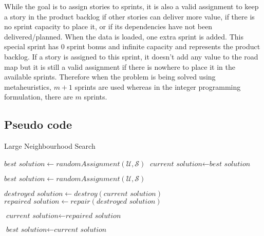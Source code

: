 While the goal is to assign stories to sprints, it is also a valid assignment to keep a story in the product backlog if other stories can deliver more value, if there is no sprint capacity to place it, or if its dependencies have not been delivered/planned. When the data is loaded, one extra sprint is added. This special sprint has 0 sprint bonus and infinite capacity and represents the product backlog. If a story is assigned to this sprint, it doesn't add any value to the road map but it is still a valid assignment if there is nowhere to place it in the available sprints. Therefore when the problem is being solved using metaheuristics, $m + 1$ sprints are used whereas in the integer programming formulation, there are $m$ sprints.

\subsection{Pseudo code}

\begin{algorithm}[H]
\caption{Large Neighbourhood Search}\label{metaheuristic}
\begin{algorithmic}[1]
        \State $\textit{best solution} \gets \textit{randomAssignment}(\mathcal{U}, \mathcal{S})$
        \State $\textit{current solution} \gets \textit{best solution}$
        
                \State $\textit{best solution} \gets \textit{randomAssignment}(\mathcal{U}, \mathcal{S})$
            \EndIf
            
            \State $\textit{destroyed solution} \gets \textit{destroy}(\textit{current solution})$
            \State $\textit{repaired solution} \gets \textit{repair}(\textit{destroyed solution})$
            
                \State $\textit{current solution} \gets \textit{repaired solution}$
                
                    \State $\textit{best solution} \gets \textit{current solution}$
                \EndIf
            \EndIf
        \EndWhile
        
        \State {}
    \EndProcedure
\end{algorithmic}
\end{algorithm}


